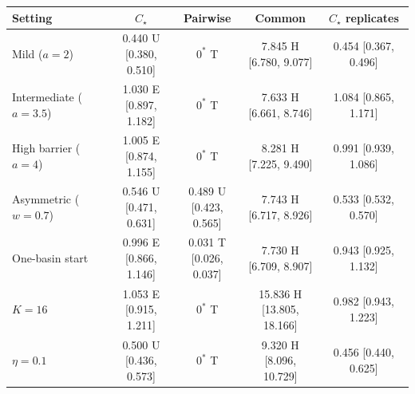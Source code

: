 \begin{tabular}{lcccc}
\toprule
Setting & $C_\star$ & Pairwise & Common & $C_\star$ replicates \\
\midrule
Mild ($a=2$) & \shortstack{0.440 U \\{} [0.380, 0.510]} & $0^{*}$ T & \shortstack{7.845 H \\{} [6.780, 9.077]} & 0.454 [0.367, 0.496] \\[2pt]
Intermediate ($a=3.5$) & \shortstack{1.030 E \\{} [0.897, 1.182]} & $0^{*}$ T & \shortstack{7.633 H \\{} [6.661, 8.746]} & 1.084 [0.865, 1.171] \\[2pt]
High barrier ($a=4$) & \shortstack{1.005 E \\{} [0.874, 1.155]} & $0^{*}$ T & \shortstack{8.281 H \\{} [7.225, 9.490]} & 0.991 [0.939, 1.086] \\[2pt]
Asymmetric ($w=0.7$) & \shortstack{0.546 U \\{} [0.471, 0.631]} & \shortstack{0.489 U \\{} [0.423, 0.565]} & \shortstack{7.743 H \\{} [6.717, 8.926]} & 0.533 [0.532, 0.570] \\[2pt]
One-basin start & \shortstack{0.996 E \\{} [0.866, 1.146]} & \shortstack{0.031 T \\{} [0.026, 0.037]} & \shortstack{7.730 H \\{} [6.709, 8.907]} & 0.943 [0.925, 1.132] \\[2pt]
$K=16$ & \shortstack{1.053 E \\{} [0.915, 1.211]} & $0^{*}$ T & \shortstack{15.836 H \\{} [13.805, 18.166]} & 0.982 [0.943, 1.223] \\[2pt]
$\eta=0.1$ & \shortstack{0.500 U \\{} [0.436, 0.573]} & $0^{*}$ T & \shortstack{9.320 H \\{} [8.096, 10.729]} & 0.456 [0.440, 0.625] \\[2pt]
\bottomrule
\end{tabular}

